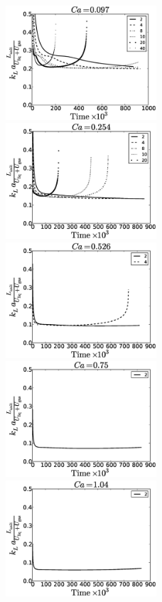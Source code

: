 \documentclass{article}
\begin{document}
\begin{figure}[htb!]
\includegraphics[width=0.5\textwidth]{Figures/aver_conc_scale_ca_time097.eps}
\includegraphics[width=0.5\textwidth]{Figures/aver_conc_scale_ca_time054.eps}\\
\includegraphics[width=0.5\textwidth]{Figures/aver_conc_scale_ca_time026.eps}
\includegraphics[width=0.5\textwidth]{Figures/aver_conc_scale_ca_time05.eps}\\
\includegraphics[width=0.5\textwidth]{Figures/aver_conc_scale_ca_time14.eps}

\end{figure}
\end{document}
